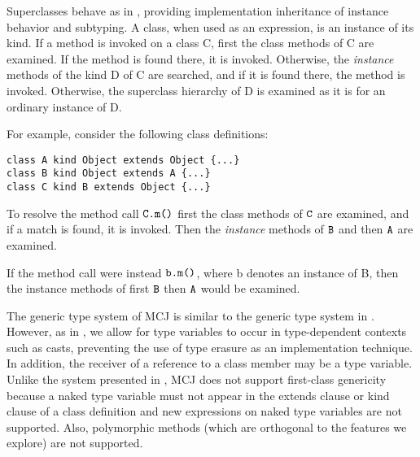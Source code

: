 \documentclass{acmconfbig}
\begin{document}
Superclasses behave as in \FGJ, providing implementation inheritance
of instance behavior and subtyping. A class, when used as an
expression, is an instance of its kind.  If a method is invoked on a
class {\txt C}, first the class methods of {\txt C} are examined.  If
the method is found there, it is invoked. Otherwise, the
\emph{instance} methods of the kind {\txt D} of {\txt C} are searched,
and if it is found there, the method is invoked.  Otherwise, the
superclass hierarchy of {\txt D} is examined as it is for an ordinary
instance of {\txt D}.

For example, consider the following class definitions:

\begin{verbatim}
class A kind Object extends Object {...}
class B kind Object extends A {...}
class C kind B extends Object {...}
\end{verbatim}

To resolve the method call $\mbox{{\ensuremath {\mbox {\tt C}}}{\tt .}{\ensuremath{\mbox {\tt m}\mbox{\tt (}{\overline{{}}}\mbox{\tt )}}}}$ first the class
methods of $\mbox {\tt C}$ are examined, and if a match is found, it is invoked.
Then the \emph{instance} methods of $\mbox {\tt B}$ and then $\mbox {\tt A}$ are examined.

If the method call were instead $\mbox{{\ensuremath {\mbox {\tt b}}}{\tt .}{\ensuremath{\mbox {\tt m}\mbox{\tt (}{\overline{{}}}\mbox{\tt )}}}}$, where {\txt
b} denotes an instance of {\txt B}, then the instance methods of first
$\mbox {\tt B}$ then $\mbox {\tt A}$ would be examined.






The generic type system of MCJ is similar to the generic type system
in \FGJ. However, as in \cite{NextGen, DimUnits}, we allow for type
variables to occur in type-dependent contexts such as casts,
preventing the use of type erasure as an implementation technique. In
addition, the receiver of a reference to a class member may be a type
variable. Unlike the system presented in \cite{MixGen}, MCJ does not
support first-class genericity because a naked type variable must not
appear in the {\txt extends} clause or {\txt kind} clause of a class
definition and {\txt new} expressions on naked type variables are not
supported. Also, polymorphic methods (which are orthogonal to the
features we explore) are not supported.
\end{document}

